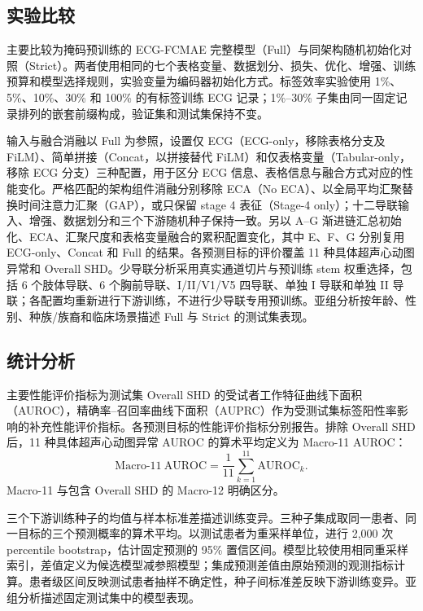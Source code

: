 \subsection{实验比较}
\label{sec:comparisons}

主要比较为掩码预训练的 ECG-FCMAE 完整模型（Full）与同架构随机初始化对照（Strict）。两者使用相同的七个表格变量、数据划分、损失、优化、增强、训练预算和模型选择规则，实验变量为编码器初始化方式。标签效率实验使用 1\%、5\%、10\%、30\% 和 100\% 的有标签训练 ECG 记录；1\%--30\% 子集由同一固定记录排列的嵌套前缀构成，验证集和测试集保持不变。

输入与融合消融以 Full 为参照，设置仅 ECG（ECG-only，移除表格分支及 FiLM）、简单拼接（Concat，以拼接替代 FiLM）和仅表格变量（Tabular-only，移除 ECG 分支）三种配置，用于区分 ECG 信息、表格信息与融合方式对应的性能变化。严格匹配的架构组件消融分别移除 ECA（No ECA）、以全局平均汇聚替换时间注意力汇聚（GAP），或只保留 stage 4 表征（Stage-4 only）；十二导联输入、增强、数据划分和三个下游随机种子保持一致。另以 A--G 渐进链汇总初始化、ECA、汇聚尺度和表格变量融合的累积配置变化，其中 E、F、G 分别复用 ECG-only、Concat 和 Full 的结果。各预测目标的评价覆盖 11 种具体超声心动图异常和 Overall SHD。少导联分析采用真实通道切片与预训练 stem 权重选择，包括 6 个肢体导联、6 个胸前导联、I/II/V1/V5 四导联、单独 I 导联和单独 II 导联；各配置均重新进行下游训练，不进行少导联专用预训练。亚组分析按年龄、性别、种族/族裔和临床场景描述 Full 与 Strict 的测试集表现。

\subsection{统计分析}
\label{sec:statistics}

主要性能评价指标为测试集 Overall SHD 的受试者工作特征曲线下面积（AUROC），精确率--召回率曲线下面积（AUPRC）作为受测试集标签阳性率影响的补充性能评价指标。各预测目标的性能评价指标分别报告。排除 Overall SHD 后，11 种具体超声心动图异常 AUROC 的算术平均定义为 Macro-11 AUROC：
\begin{equation}
\mathrm{Macro\mbox{-}11\ AUROC}=\frac{1}{11}
\sum_{k=1}^{11}\mathrm{AUROC}_k.
\label{eq:macro11}
\end{equation}
Macro-11 与包含 Overall SHD 的 Macro-12 明确区分。

三个下游训练种子的均值与样本标准差描述训练变异。三种子集成取同一患者、同一目标的三个预测概率的算术平均。以测试患者为重采样单位，进行 2,000 次 percentile bootstrap，估计固定预测的 95\% 置信区间。模型比较使用相同重采样索引，差值定义为候选模型减参照模型；集成预测差值由原始预测的观测指标计算。患者级区间反映测试患者抽样不确定性，种子间标准差反映下游训练变异。亚组分析描述固定测试集中的模型表现。


